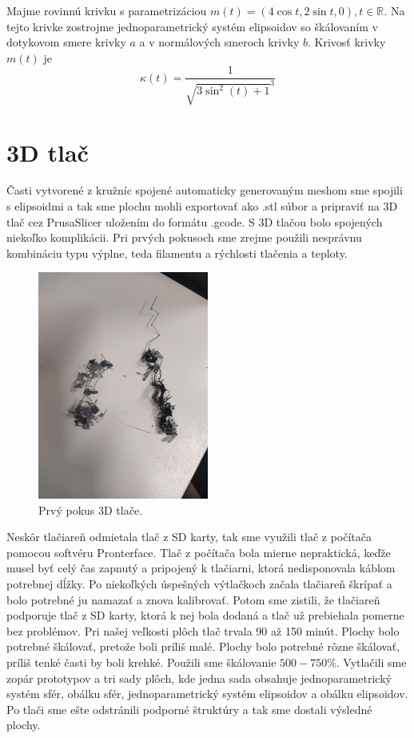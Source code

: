 \begin{example}[Elipsa]
Majme rovinnú krivku s parametrizáciou $m(t)=(4 \cos t, 2 \sin t, 0), t \in \mathbb{R}.$ Na tejto krivke zostrojme jednoparametrický systém elipsoidov so škálovaním v dotykovom smere krivky $a$ a v normálových smeroch krivky $b$.
Krivosť krivky $m(t)$ je
$$
\kappa(t) = \frac{1}{\sqrt{3 \sin^{2}{\left(t \right)} + 1}^{3}}
$$
\end{example}

\section{3D tlač}
Časti vytvorené z kružníc spojené automaticky generovaným meshom sme spojili s elipsoidmi a tak sme plochu mohli exportovať ako .stl súbor a pripraviť na 3D tlač cez PrusaSlicer uložením do formátu .gcode. S 3D tlačou bolo spojených niekoľko komplikácii. Pri prvých pokusoch sme zrejme použili nesprávnu kombináciu typu výplne, teda filamentu a rýchlosti tlačenia a teploty. 

\begin{figure}[h]
	\centering
	\includegraphics[width=0.5\textwidth]{images/tlac_prvy_pokus.jpg}
	\caption[Prvý pokus 3D tlače.]{Prvý pokus 3D tlače.}
	\label{fig:prvypokus}
\end{figure}

Neskôr tlačiareň odmietala tlač z SD karty, tak sme využili tlač z počítača pomocou softvéru Pronterface. Tlač z počítača bola mierne nepraktická, keďže musel byť celý čas zapnutý a pripojený k tlačiarni, ktorá nedisponovala káblom potrebnej dĺžky. Po niekoľkých úspešných výtlačkoch začala tlačiareň škrípať a bolo potrebné ju namazať a znova kalibrovať. Potom sme zistili, že tlačiareň podporuje tlač z SD karty, ktorá k nej bola dodaná a tlač už prebiehala pomerne bez problémov. Pri našej veľkosti plôch tlač trvala 90 až 150 minút. Plochy bolo potrebné škálovať, pretože boli príliš malé. Plochy bolo potrebné rôzne škálovať, príliš tenké časti by boli krehké. Použili sme škálovanie $500-750\%$. Vytlačili sme zopár prototypov a tri sady plôch, kde jedna sada obsahuje jednoparametrický systém sfér, obálku sfér, jednoparametrický systém elipsoidov a obálku elipsoidov. Po tlači sme ešte odstránili podporné štruktúry a tak sme dostali výsledné plochy. 

